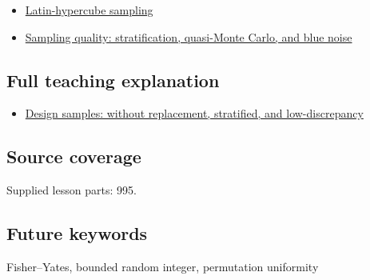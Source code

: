 \begin{itemize}
\tightlist
\item
  \hyperref[appendix-1c5e85693a06]{Latin-hypercube sampling}
\item
  \hyperref[appendix-9f693ffd82bc]{Sampling quality: stratification, quasi-Monte Carlo, and blue noise}
\end{itemize}

\subsection{Full teaching explanation}\label{appendix-184fcc411663-full-teaching-explanation}

\begin{itemize}
\tightlist
\item
  \hyperref[02-foundations-ii-ch031-design-samples-without-replacement-stratified-and-low-discrepancy]{Design samples: without replacement, stratified, and low-discrepancy}
\end{itemize}

\subsection{Source coverage}\label{appendix-184fcc411663-source-coverage}

Supplied lesson parts: 995.

\subsection{Future keywords}\label{appendix-184fcc411663-future-keywords}

Fisher--Yates, bounded random integer, permutation uniformity
